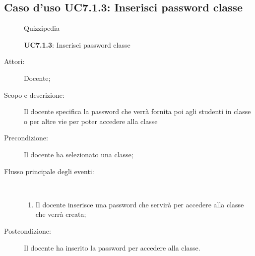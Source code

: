 \subsection{Caso d'uso UC7.1.3: Inserisci password classe}
	\begin{figure}[H]
		\centering
		\begin{resizedtikzpicture}{\textwidth}
		\begin{umlsystem}[x=0, fill=lightgray!20]{Quizzipedia}
		\end{umlsystem}
		\end{resizedtikzpicture}
		\caption{\textbf{UC7.1.3}: Inserisci password classe}
		\label{UC7.1.3}
	\end{figure}
\begin{description}
\item[Attori:] Docente;
\item[Scopo e descrizione:] Il docente specifica la password che verrà fornita poi agli studenti in classe o per altre vie per poter accedere alla classe
      \item[Precondizione:] Il docente ha selezionato una classe;

        \item[Flusso principale degli eventi:] \ 
 \begin{enumerate}
          \item Il docente inserisce una password che servirà per accedere alla classe che verrà creata;

      \end{enumerate}
    \item[Postcondizione:] Il docente ha inserito la password per accedere alla classe.
  \end{description}
\hypertarget{UC7.2}{}
